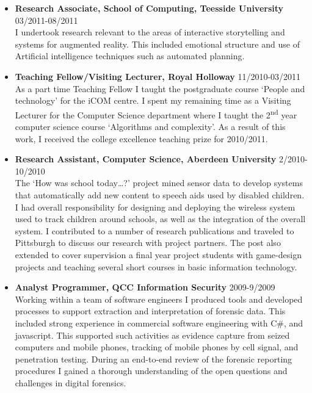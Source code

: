 \documentclass[10pt]{article}
\newenvironment{outerlist}[1][\enskip\textbullet]%
        {\begin{itemize}[#1]}{\end{itemize}%
         \vspace{-.6\baselineskip}}
\begin{document}
\begin{outerlist}
\item[] {\bf  Research Associate, School of Computing, Teesside University} \hfill 03/2011-08/2011 \\
I undertook research relevant to the areas of interactive storytelling and systems for augmented reality. This included emotional structure and use of Artificial intelligence techniques such as automated planning.

\item[] {\bf Teaching Fellow/Visiting Lecturer, Royal Holloway} \hfill 11/2010-03/2011 \\
As a part time Teaching Fellow  I taught the postgraduate course `People and technology' for the iCOM centre.  I spent my remaining time as a Visiting Lecturer for the Computer Science department where I taught the 2\textsuperscript{nd} year computer science course `Algorithms and complexity'. As a result of this work, I received the college excellence teaching prize for 2010/2011. 

\item[] {\bf Research Assistant, Computer Science, Aberdeen University} \hfill {2/2010-10/2010}\\
    The `How was school today\ldots?' project  mined sensor data to develop systems that automatically add new content to speech aids used by disabled children. I had overall responsibility for designing and deploying the wireless system used to track children around schools, as well as the integration of the overall system.  I contributed to a number of research publications and traveled to Pittsburgh to discuss our research with project partners. The post also extended to cover supervision a final year project students with game-design projects and teaching several short courses in basic information technology. 
    


\item[] {\bf Analyst Programmer, QCC Information Security} \hfill {2009-9/2009}\\
Working within a team of software engineers I produced tools and developed processes to support extraction and interpretation of forensic data. This included strong experience in commercial software engineering with C\#,  and javascript.  This supported such activities as evidence capture from seized computers and mobile phones, tracking of mobile phones by cell signal, and penetration testing.  During an end-to-end review of the forensic reporting procedures I gained a thorough understanding of the open questions and challenges in digital forensics.  


\end{outerlist}
\end{document}
